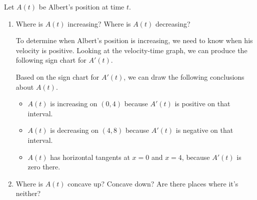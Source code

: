 \documentclass{article}
\begin{document}
\begin{enumerate}
  Let $A(t)$ be Albert's position at time $t$. 

  \begin{enumerate}

  \item \label{given-velocity-sketch-position-1-inc-dec}
    \begin{problem}[\vfill]
      Where is $A(t)$ increasing? Where is $A(t)$ decreasing?
    \end{problem}

    \begin{solution}
      To determine when Albert's position is increasing, we need to know
      when his velocity is positive. Looking at the velocity-time
      graph, we can produce the following sign chart for $A'(t)$. 

      \begin{center}
      \end{center}

      Based on the sign chart for $A'(t)$, we can draw the following conclusions
      about $A(t)$. 

      \begin{itemize}
        \item $A(t)$ is increasing on $(0, 4)$ because $A'(t)$ is positive 
          on that interval.
        \item $A(t)$ is decreasing on $(4, 8)$ because $A'(t)$ is negative
          on that interval.
        \item $A(t)$ has horizontal tangents at
          $x=0$ and $x=4$, because $A'(t)$ is zero there.
      \end{itemize}

    \end{solution}

  \item \label{given-velocity-sketch-position-1-concavity}
    \begin{problem}[\vfill]
      Where is $A(t)$ concave up? Concave down? Are there places where it's neither?
    \end{problem}


\end{enumerate}
\end{enumerate}
\end{document}
